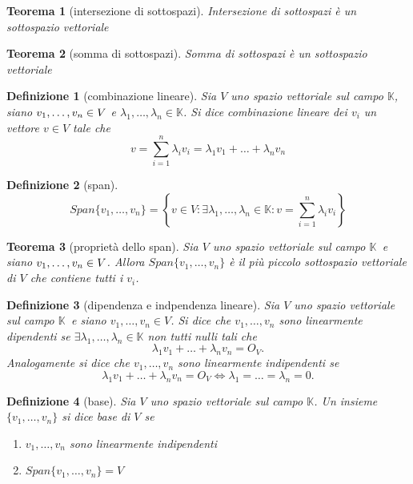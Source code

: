 \documentclass[9pt, a4paper]{article}
\newcommand{\K}{\mathbb{K}}
\newcommand{\letvs}{Sia $ V $ uno spazio vettoriale sul campo $ \K $}
\theoremstyle{mythm}
\newtheorem{definition}{Definizione}[section]
\newtheorem{thm}{Teorema}[section]
\begin{document}
\clearpage

\begin{thm}[intersezione di sottospazi]
	\textsf{Intersezione di sottospazi è un sottospazio vettoriale}
\end{thm}

\begin{thm}[somma di sottospazi]
	\textsf{Somma di sottospazi è un sottospazio vettoriale}
\end{thm}

\begin{definition}[combinazione lineare]
	\letvs, siano $ v_1, \ldots , v_n \in \nobreak V $ e $ \lambda_1, \ldots , \lambda_n \in \K $. Si dice combinazione lineare dei $ v_i $ un vettore $ v \in V $ tale che \[v = \sum_{i=1}^{n} \lambda_i v_i = \lambda_1 v_1 + \ldots + \lambda_n v_n \]
\end{definition}

\begin{definition}[span]
	\[Span\{v_1, \ldots , v_n\} = \left\{ v \in V: \exists \lambda_1, \ldots , \lambda_n \in \K: v = \sum_{i=1}^{n} \lambda_i v_i \right\}\]
\end{definition}

\begin{thm}[proprietà dello span]
	\letvs \, e siano $ v_1, \ldots , v_n \in \nolinebreak V $. Allora $ Span\{v_1, \ldots , v_n\} $ è il più piccolo sottospazio vettoriale di $ V $ che contiene tutti i $ v_i $.
\end{thm}

\begin{definition}[dipendenza e indpendenza lineare] 
	\letvs \, e siano $ v_1, \ldots , v_n \in V $. Si dice che $ v_1, \ldots, v_n $ sono linearmente dipendenti se $ \exists \lambda_1, \ldots , \lambda_n \in \K $ non tutti nulli tali che \[\lambda_1 v_1 + \ldots + \lambda_n v_n = O_V.\] Analogamente si dice che $ v_1, \ldots, v_n $ sono linearmente indipendenti se \[\lambda_1 v_1 + \ldots + \lambda_n v_n = O_V \Leftrightarrow \lambda_1 = \ldots = \lambda_n = 0.\]	
\end{definition}

\begin{definition}[base]
	\letvs. Un insieme $ \{v_1, \ldots, v_n\} $ si dice base di $ V $ se
	\begin{enumerate}[label=(\roman*)]
		\item $ v_1, \ldots, v_n $ sono linearmente indipendenti
		\item $ Span\{v_1, \ldots , v_n\} = V $
	\end{enumerate}
\end{definition}
\end{document}
